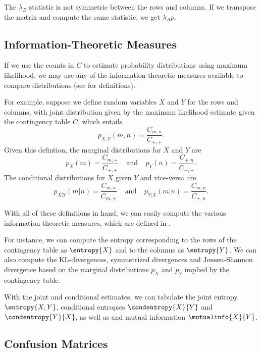 The $\lambda_B$ statistic is not symmetric between the rows and
columns.  If we transpose the matrix and compute the same statistic,
we get $\lambda_Ap$.


\subsection{Information-Theoretic Measures}

If we use the counts in $C$ to estimate probability distributions
using maximum likelihood, we may use any of the information-theoretic
measures available to compare distributions (see
 for definitions).  

For example, suppose we define random variables $X$ and $Y$ for the
rows and columns, with joint distribution given by the maximum
likelihood estimate given the contingency table $C$, which entails
%
\begin{equation}
p_{X,Y}(m,n) = \frac{C_{m,n}}{C_{+,+}}.
\end{equation}
%
Given this defintion, the marginal distributions for $X$ and $Y$ are
%
\begin{equation}
p_X(m) = \frac{C_{m,+}}{C_{+,+}}
\ \ \ \ \ \mbox{and} \ \ \ \ \
p_Y(n) = \frac{C_{+,n}}{C_{+,+}}.
\end{equation}
%
The conditional distributions for $X$ given $Y$ and vice-versa are
%
\begin{equation}
p_{X|Y}(m|n) = \frac{C_{m,n}}{C_{m,+}}
\ \ \ \ \ \mbox{and} \ \ \ \ \
p_{Y|X}(m|n) = \frac{C_{m,n}}{C_{+,n}}.
\end{equation}

With all of these definitions in hand, we can easily compute the
various information theoretic measures, which are defined in
\refsec{stats-information-theory}.

For instance, we can compute the entropy corresponding to the rows of
the contingency table as $\entropy{X}$ and to the columns as
$\entropy{Y}$.  We can also compute the KL-divergences, symmetrized
divergences and Jensen-Shannon divergence based on the marginal
distributions $p_X$ and $p_Y$ implied by the contingency table.

With the joint and conditional estimates, we can tabulate the joint
entropy $\entropy{X,Y}$, conditional entropies $\condentropy{X}{Y}$
and $\condentropy{Y}{X}$, as well as and mutual information
$\mutualinfo{X}{Y}$.


\subsection{Confusion Matrices}

